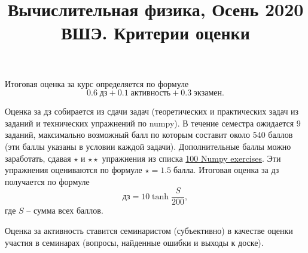 \documentclass[prb,papersize=a4paper,notitlepage]{revtex4-1}%
\begin{document}
\title{Вычислительная физика, Осень 2020 ВШЭ. Критерии оценки}
\maketitle
Итоговая оценка за курс определяется по формуле $$0.6\;\textrm{дз} + 0.1\;\textrm{активность} + 0.3\;\textrm{экзамен}.$$

Оценка за дз собирается из сдачи задач (теоретических и практических задач из заданий и технических упражнений по numpy). В течение семестра ожидается 9 заданий, максимально возможный балл по которым составит около 540 баллов (эти баллы указаны в условии каждой задачи). Дополнительные баллы можно заработать, сдавая $\star$ и $\star\star$ упражнения из списка \href{https://github.com/rougier/numpy-100/blob/master/100_Numpy_exercises.md}{100 Numpy exercises}. Эти упражнения оцениваются по формуле $\star = 1.5 \;\textrm{балла}$. Итоговая оценка за дз получается по формуле $$\textrm{дз} = 10\tanh\frac{S}{200},$$ где $S$ -- сумма всех баллов.

Оценка за активность ставится семинаристом (субъективно) в качестве оценки участия в семинарах (вопросы, найденные ошибки и выходы к доске).
\end{document}
